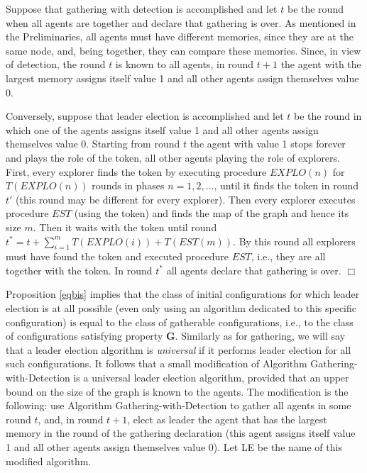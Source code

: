 \documentclass[11pt]{article}
\newcommand{\qed}{\hfill $\Box$ \bigbreak}
\newenvironment{proof}{\noindent {\bf Proof.}}{\qed}
\begin{document}
\begin{proof}
Suppose that gathering with detection is accomplished and let $t$ be the round when all agents
are together and declare that gathering is over. As mentioned in the Preliminaries, all agents must have different
memories, since they are at the same node, and, being together, they can compare these memories. 
Since,  in view of detection, the round $t$ is known to all agents,
in round $t+1$ the agent with 
the largest memory assigns itself value 1 and all other agents assign themselves value 0.

Conversely, suppose that leader election is accomplished and let $t$ be the round in which one 
of the agents assigns itself value 1 and all other agents assign themselves value 0. Starting from round $t$
the agent with value 1 stops forever and plays the role of the token, all other agents playing the role of explorers.
First, every explorer finds the token by executing procedure $EXPLO(n)$ for $T(EXPLO(n))$ rounds in phases 
$n=1,2,...$, until it finds the token in round $t'$ (this round may be different for every explorer). 
Then every explorer executes procedure $EST$ (using the token) and finds the map of the graph and hence its size $m$.
Then it waits with the token until round $t^*=t+\sum_{i=1}^m T(EXPLO(i))+T(EST(m))$. By this round
all explorers must have found the token and executed procedure $EST$, i.e., they are all together with the token.
In round $t^*$ all agents declare that gathering is over. 
\end{proof}

Proposition \ref{eqbis} implies that the class of initial configurations for which leader election is at all possible (even only using an algorithm dedicated
to this specific configuration) is equal to the class of gatherable configurations, i.e., to the class of configurations
satisfying property {\bf G}. Similarly as for gathering, we will say that a leader election algorithm is {\em universal} if it performs leader election for all
such configurations. It follows that a small modification of Algorithm Gathering-with-Detection is a universal leader election algorithm,
provided that an upper bound on the size of the graph is known to the agents. The modification is 
the following: use Algorithm Gathering-with-Detection to gather all agents in some round $t$, and, in round $t+1$, elect as leader the agent that has the largest 
memory in the round of the gathering declaration (this agent assigns itself value 1 and all other agents assign themselves value 0). Let LE be the name of this modified algorithm.
\end{document}
